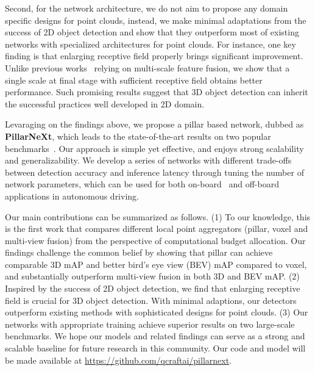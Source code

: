 \documentclass[10pt,twocolumn,letterpaper]{article}
\begin{document}
Second, for the network architecture, we do not aim to propose any domain specific designs for point clouds, instead, we make minimal adaptations from the success of 2D object detection and show that they outperform most of existing networks with specialized architectures for point clouds. For instance, one key finding is that enlarging receptive field properly brings significant improvement. Unlike previous works~\cite{zhou2018voxelnet, shi2022pillarnet} relying on multi-scale feature fusion, we show that a single scale at final stage with sufficient receptive field obtains better performance. Such promising results suggest that 3D object detection can inherit the successful practices well developed in 2D domain.

Levaraging on the findings above, we propose a pillar based network, dubbed as \textbf{PillarNeXt}, which leads to the state-of-the-art results on two popular benchmarks~\cite{Sun_2020_CVPR, caesar2020nuscenes}. Our approach is simple yet effective, and enjoys strong scalability and generalizability. We develop a series of networks with different trade-offs between detection accuracy and inference latency through tuning the number of network parameters, 
which can be used for both on-board~\cite{lang2019pointpillars} and off-board~\cite{qi2021offboard} applications in autonomous driving. 


Our main contributions can be summarized as follows. (1) To our knowledge, this is the first work that compares different local point aggregators (pillar, voxel and multi-view fusion) from the perspective of computational budget allocation. Our findings challenge the common belief by showing that pillar can achieve comparable 3D mAP and better bird's eye view (BEV) mAP compared to voxel, and substantially outperform multi-view fusion in both 3D and BEV mAP. (2) Inspired by the success of 2D object detection, we find that enlarging receptive field is crucial for 3D object detection. With minimal adaptions, our detectors outperform existing methods with sophisticated designs for point clouds. (3) Our networks with appropriate training achieve superior results on two large-scale benchmarks. We hope our models and related findings can serve as a strong and scalable baseline for future research in this community. Our code and model will be made available at \url{https://github.com/qcraftai/pillarnext}.   
\end{document}
